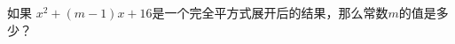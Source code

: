 \item {
    如果 $x^2 + (m-1)x + 16$是一个完全平方式展开后的结果，那么常数$m$的值是多少？ 
    \\ \\ \\
}

\begin{comment}
\item {
    $a=2^{44}, b=3^{33}, c=5^{22}$, 比较$a, b, c$的大小. 
    \ifshowSolution
    \fangsong\zihao{4}
    \\
    思路: 把指数化为一样, 比较底数大小. 

    解答: 
    \begin{align*}
        a &= (2^4)^{11} = 16^{11}\\
        b &= (3^3)^{11} = 27^{11}\\
        c &= (5^2)^{11} = 25^{11}\\
        & 16^{11} < 25^{11} < 27^{11}\\
        &\therefore a < c < b. 
    \end{align*}
    \else
        \\ \\ \\
    \fi
}
\end{comment}

\begin{comment}
\item {
    已知$100^a=20, 1000^b=50$, 则$a+\frac{3}{2}b-\frac{3}{2}$的值是多少? 
    \ifshowSolution
    \fangsong\zihao{4}
    \\
    思路: 观察$100^a, 1000^b$ 发现 $a, b$都出现在指数上, 要求$a+\frac{3}{2}b-\frac{3}{2}$的值, 应该想到尝试把$a+\frac{3}{2}b-\frac{3}{2}$放在指数上. 

    解答: 
    \begin{align*}
        100^{a+\frac{3}{2}b-\frac{3}{2}} &= \frac{100^a\cdot 100^{\frac{3}{2}b}}{100^\frac{3}{2}}\\
        &= \frac{100^a\cdot 10^{2\cdot \frac{3}{2}b}}{10^{2\cdot\frac{3}{2}}}\\
        &= \frac{100^a\cdot 10^{3b}} {10^{3}}\\
        &= \frac{100^a\cdot 1000^{b}} {1000}\\
        &= \frac{20\times 50} {1000}\\
        &= 1\\
        &\therefore a+\frac{3}{2}b-\frac{3}{2} = 0. 
    \end{align*}
    \else
        \\ \\ \\
    \fi
}
\end{comment}

